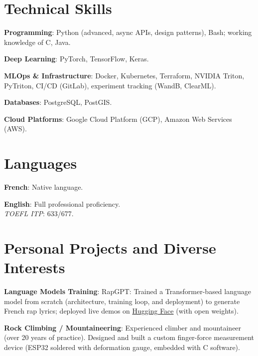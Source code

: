 \documentclass[a4paper,10pt]{article}
\newcommand{\resumeItem}[2]{
  \item\small{
    \textbf{#1}{: #2\vspace{-0.8pt}}
  }
}
\newcommand{\resumeSubItem}[2]{
    \small{\resumeItem{#1}{#2}\vspace{-4pt}}
	}
\newcommand{\resumeSubHeadingListStart}{\begin{itemize}[leftmargin=*]}
\newcommand{\resumeSubHeadingListEnd}{\end{itemize}}
\begin{document}
\begin{minipage}[t]{0.65\linewidth}
    \section{Technical Skills}
    \resumeSubHeadingListStart
    \resumeSubItem{Programming}{Python (advanced, async APIs, design patterns), Bash; working knowledge of C, Java.}
    \resumeSubItem{Deep Learning}{PyTorch, TensorFlow, Keras.}
    \resumeSubItem{MLOps \& Infrastructure}{Docker, Kubernetes, Terraform, NVIDIA Triton, PyTriton, CI/CD (GitLab), experiment tracking (WandB, ClearML).}
    \resumeSubItem{Databases}{PostgreSQL, PostGIS.}
    \resumeSubItem{Cloud Platforms}{Google Cloud Platform (GCP), Amazon Web Services (AWS).}
    \resumeSubHeadingListEnd
    \end{minipage}
\hfill
\begin{minipage}[t]{0.3\linewidth}
    \section{Languages}
    \resumeSubHeadingListStart
    \resumeSubItem{French}{Native language.}
    \resumeSubItem{English}{Full professional proficiency. \\ \emph{TOEFL ITP}: 633/677.}
    \resumeSubHeadingListEnd
\end{minipage}



\section{Personal Projects and Diverse Interests}
\vspace{0.5mm}
\begin{minipage}[t]{0.9865\textwidth}
\resumeSubHeadingListStart
  \resumeSubItem{Language Models Training}{RapGPT: Trained a Transformer-based language model from scratch (architecture, training loop, and deployment) to generate French rap lyrics; deployed live demos on \href{https://huggingface.co/spaces/hugojarkoff/rapGPT}{Hugging Face} (with open weights).}
  \resumeSubItem{Rock Climbing / Mountaineering}{Experienced climber and mountaineer (over 20 years of practice). Designed and built a custom finger-force measurement device (ESP32 soldered with deformation gauge, embedded with C software).}
\resumeSubHeadingListEnd
\end{minipage}


\end{document}
